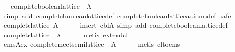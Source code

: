 \begin{isabellebody}
\ \ \ {}complete{}boolean{}lattice\ {}{}\ A{}{}\isanewline
%
\isadelimproof
%
\endisadelimproof
%
\isatagproof
{}\isamarkupfalse%
\ {}simp\ add{}\ complete{}boolean{}lattice{}def\ complete{}boolean{}lattice{}axioms{}def{}\ safe{}\isanewline
\ \ \isamarkupfalse%
\ {}complete{}lattice\ A{}\isanewline
\ \ \ \ \isamarkupfalse%
\ {}insert\ cbl{}A{}\ simp\ add{}\ complete{}boolean{}lattice{}def{}\isanewline
\ \ \isamarkupfalse%
\ {}complete{}lattice\ {}{}\ A{}{}\isanewline
\ \ \ \ \isamarkupfalse%
\ {}metis\ extend{}cl{}\isanewline
\ \ \isamarkupfalse%
\ cms{}A{}ex{}\ {}complete{}meet{}semilattice\ {}{}\ A{}{}\isanewline
\ \ \ \ \isamarkupfalse%
\ {}metis\ cl{}to{}cms{}\isanewline

\end{isabellebody}
